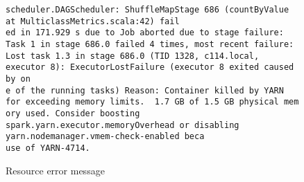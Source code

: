 \documentclass[11pt]{article}
\begin{document}
\begin{figure}
\begin{verbatim}
scheduler.DAGScheduler: ShuffleMapStage 686 (countByValue at MulticlassMetrics.scala:42) fail
ed in 171.929 s due to Job aborted due to stage failure: Task 1 in stage 686.0 failed 4 times, most recent failure: 
Lost task 1.3 in stage 686.0 (TID 1328, c114.local, executor 8): ExecutorLostFailure (executor 8 exited caused by on
e of the running tasks) Reason: Container killed by YARN for exceeding memory limits.  1.7 GB of 1.5 GB physical mem
ory used. Consider boosting spark.yarn.executor.memoryOverhead or disabling yarn.nodemanager.vmem-check-enabled beca
use of YARN-4714.
\end{verbatim}
\caption{Resource error message}
\label{reserr}
\end{figure}
\end{document}
